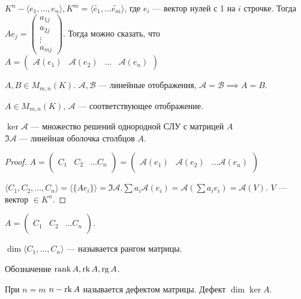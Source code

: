 $K^n - \langle e_1, \ldots, e_n \rangle, K^m = \langle \widetilde{e_1}, \ldots \widetilde{e_m} \rangle$, где $e_i$ --- вектор нулей с 1 на  $i$ строчке. Тогда 
$A e_j = \begin{pmatrix} a_{1j} \\ a_{2j} \\ \vdots \\ a_{mj} \end{pmatrix}$. 
Тогда можно сказать, что $A = \left(\begin{array}{c|c|c|c} \mathcal{A}(e_1) & \mathcal{A}(e_2) & \ldots & \mathcal{A}(e_n) \end{array} \right)$ 

\begin{consequence}
    $A, B \in M_{m, n}(K)$.  $\mathcal{A}, \mathcal{B}$ --- линейные отображения,  $\mathcal{A} = \mathcal{B} \implies A = B$.
\end{consequence}
\begin{statement}
    $A \in M_{m, n}(K)$,  $\mathcal{A}$ --- соответствующее отображение.

    $\ker \mathcal{A}$ --- множество решений однородной СЛУ с матрицей  $A$\\
    $\Im \mathcal{A}$ --- линейная оболочка столбцов $A$.
\end{statement}
\begin{proof}
    $A = \left( \begin{array}{c|c|c} & &  \\ C_1 & C_2 & \ldots C_n \\ & & \end{array} \right) = \left(\begin{array}{c|c|c} & &  \\ \mathcal{A}(e_1) & \mathcal{A}(e_2) & \ldots \mathcal{A}(e_n) \\ & & \end{array} \right)$ 

    $\langle C_1, C_2, \ldots, C_n \rangle = \langle \{A e_i \} \rangle = \Im \mathcal{A}. \sum a_i \mathcal{A}(e_i) = \mathcal{A}(\sum a_i e_i) = \mathcal{A}(V)$. $V$ --- вектор  $\in K^n$.
\end{proof}
\begin{definition}
    $A = \left( \begin{array}{c|c|c} & &  \\ C_1 & C_2 & \ldots C_n \\ & & \end{array} \right)$.

    $\dim \langle C_1, \ldots, C_n \rangle$ --- называется рангом матрицы.

    Обозначение $\operatorname{rank} A, \operatorname{rk} A, \operatorname{rg} A$.
    
    При $n=m$  $n-\operatorname{rk} A$ называется  дефектом матрицы. Дефект $\dim \ker A$.
\end{definition}
